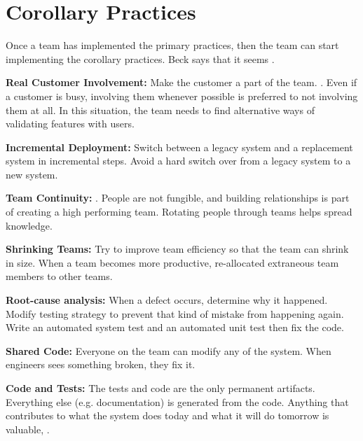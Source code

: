 \section{Corollary Practices}
Once a team has implemented the primary practices, then the team can start implementing the corollary practices. Beck says that it seems  \cite{BeckExtremeProgramming2004}.

\textbf{Real Customer Involvement:} Make the customer a part of the team.   \cite{BeckExtremeProgramming2004}. Even if a customer is busy, involving them whenever possible is preferred to not involving them at all. In this situation, the team needs to find alternative ways of validating features with users. 

\textbf{Incremental Deployment:} Switch between a legacy system and a replacement system in incremental steps. Avoid a hard switch over from a legacy system to a new system.


\textbf{Team Continuity:}   \cite{BeckExtremeProgramming2004}. People are not fungible, and building relationships is part of creating a high performing team. Rotating people through teams helps spread knowledge.

\textbf{Shrinking Teams:} Try to improve team efficiency so that the team can shrink in size. When a team becomes more productive, re-allocated extraneous team members to other teams.


\textbf{Root-cause analysis:} When a defect occurs, determine why it happened. Modify testing strategy to prevent that kind of mistake from happening again. Write an automated system test and an automated unit test then fix the code. 

\textbf{Shared Code:} Everyone on the team can modify any of the system. When engineers sees something broken, they fix it.

\textbf{Code and Tests:} The tests and code are the only permanent artifacts. Everything else (e.g. documentation) is generated from the code. Anything that contributes to what the system does today and what it will do tomorrow is valuable,  
\cite{BeckExtremeProgramming2004}.

